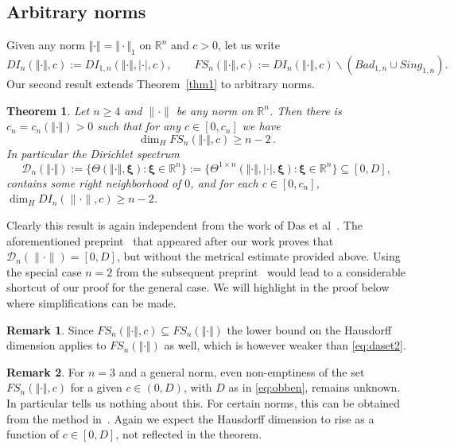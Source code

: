 \documentclass[10pt]{amsart}
\newtheorem{theorem}{Theorem}[section]
\theoremstyle{definition}
\newtheorem{remark}{Remark}
\newcommand{\ux}{\boldsymbol{\xi}}
\newcommand{\R}{\mathbb{R}}
\begin{document}
 
 \subsection{Arbitrary norms}


Given any norm $\Vert\cdot\Vert=\Vert\cdot\Vert_1$ on $\R^n$ and $c>0$,
let us write
\[
DI_{n}(\Vert\cdot\Vert,c)
:=DI_{1,n}(\Vert\cdot\Vert,\vert\cdot\vert,c),
\qquad FS_{n}(\Vert \cdot \Vert, c):=DI_{n}(\Vert\cdot\Vert,c)\backslash \left( Bad_{1,n} \cup Sing_{1,n} \right).
\]
Our second result extends Theorem~\ref{thm1} to arbitrary norms. 

\begin{theorem} \label{jia}
	Let $n\ge 4$ and $\|\cdot\|$ be any norm on $\R^n$. Then there is $c_n=c_n(\Vert\cdot\Vert)>0$ 
	such that for any $c\in[0,c_n]$ we have 
	\[
	\dim_H FS_{n}(\Vert\cdot\Vert,c) \geq n-2\, .
	\]
    In particular the Dirichlet
	spectrum 
 \[
 \mathcal{D}_{n}(\Vert\cdot\Vert):= \{\Theta(\Vert\cdot\Vert,\ux): \ux\in \R^n \}:= \{ \Theta^{1\times n}(\Vert\cdot\Vert, |\cdot|,\ux): \ux\in \R^n \} \subseteq [0,D],
 \]
 contains some right neighborhood of $0$, and for each $c\in [0,c_{n}]$, $\dim_H DI_{n}(\|\cdot\|,c)\geq n-2$.
\end{theorem}

 Clearly this result is again independent from the work of Das et al~\cite{Dasetal}. The aforementioned preprint~\cite{AginWeiss2024} that appeared after our work proves that $\mathcal{D}_{n}(\|\cdot\|)=[0,D]$, but without the metrical estimate provided above. Using the special case $n=2$ from the subsequent preprint~\cite{AginWeiss2024} would lead to a considerable shortcut of our proof for the general case. We will highlight in the proof below where simplifications can be made.

\begin{remark} Since $FS_{n}(\Vert\cdot\Vert,c)\subseteq FS_{n}(\Vert\cdot\Vert)$ the lower bound on the Hausdorff dimension applies to $FS_{n}(\Vert\cdot\Vert)$ as well, which is however weaker than \eqref{eq:daset2}. \par 
\end{remark}
\begin{remark}
For $n=3$ and a general norm, even non-emptiness of the set $FS_n(\Vert\cdot\Vert,c)$ for a given $c\in(0,D)$, with $D$ as
in \eqref{eq:obben}, remains unknown. In particular \cite{AginWeiss2024} tells us nothing about this. For certain norms, this can be obtained from the method in~\cite{j2}. Again we expect the Hausdorff dimension to rise as a function of $c\in[0,D]$, not reflected in the theorem.
\end{remark}
\end{document}
